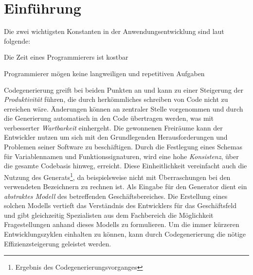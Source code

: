 \chapter{Einführung}


Die zwei wichtigsten Konstanten in der Anwendungsentwicklung sind laut \parencite{herrington2003code} folgende:
\begin{compactitem}
    \item Die Zeit eines Programmierers ist kostbar
    \item Programmierer mögen keine langweiligen und repetitiven Aufgaben
\end{compactitem}
Codegenerierung greift bei beiden Punkten an und kann zu einer Steigerung der \emph{Produktivität} führen, die durch herkömmliches schreiben von Code nicht zu erreichen wäre. 
Änderungen können an zentraler Stelle vorgenommen und durch die Generierung automatisch in den Code übertragen werden, was mit verbesserter \emph{Wartbarkeit} einhergeht.
Die gewonnenen Freiräume kann der Entwickler nutzen um sich mit den Grundlegenden Herausforderungen und Problemen seiner Software zu beschäftigen.
Durch die Festlegung eines Schemas für Variablennamen und Funktionssignaturen, wird eine hohe \emph{Konsistenz}, über die gesamte Codebasis hinweg, erreicht.
Diese Einheitlichkeit vereinfacht auch die Nutzung des Generats\footnote{Ergebnis des Codegenerierungsvorganges}, da beispielsweise nicht mit Überraschungen bei den verwendeten Bezeichnern zu rechnen ist.
Als Eingabe für den Generator dient ein \emph{abstraktes Modell} des betreffenden Geschäftsbereiches. Die Erstellung eines solchen Modells vertieft das Verständnis des Entwicklers für das Geschäftsfeld und gibt gleichzeitig Spezialisten aus dem Fachbereich die Möglichkeit Fragestellungen anhand dieses Modells zu formulieren.
Um die immer kürzeren Entwicklungszyklen einhalten zu können, kann durch Codegenerierung die nötige Effizienzsteigerung geleistet werden.



